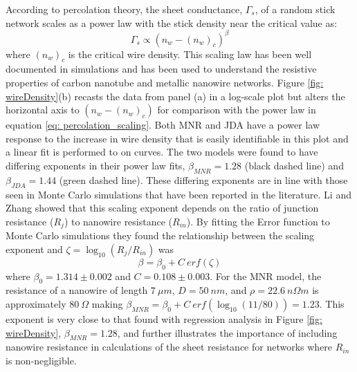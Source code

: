 According to percolation theory\cite{pike1974}, the sheet conductance, $\Gamma_s$, of a random stick network scales as a power law with the stick density near the critical value as:
\begin{equation}
\Gamma_s \propto (n_w - (n_w)_c)^{\beta}
\label{eq: percolation_scaling}
\end{equation}
where $(n_w)_c$ is the critical wire density. This scaling law has been well documented in simulations\cite{pike1974,li2009,zezelj2012} and has been used to understand the resistive properties of carbon nanotube\cite{hu2004,hecht2006} and metallic nanowire networks\cite{nirmalraj2009,bergin2012}. Figure \ref{fig: wireDensity}(b) recasts the data from panel (a) in a log-scale plot but alters the horizontal axis to $(n_w - (n_w)_c)$ for comparison with the power law in equation \ref{eq: percolation_scaling}. Both MNR and JDA have a power law response to the increase in wire density that is easily identifiable in this plot and a linear fit is performed to on curves. The two models were found to have differing exponents in their power law fits, $\beta_{MNR}=1.28$ (black dashed line) and $\beta_{JDA}= 1.44$ (green dashed line). These differing exponents are in line with those seen in Monte Carlo simulations that have been reported in the literature\cite{li2009}. Li and Zhang showed that this scaling exponent depends on the ratio of junction resistance ($R_j$) to nanowire resistance ($R_{in}$). By fitting the Error function to Monte Carlo simulations they found the relationship between the scaling exponent and $\zeta = \log_{10}(R_j/R_{in})$ was 
\begin{equation}
\beta = \beta_0 + C~ erf(\zeta)
\end{equation}
where $\beta_0 = 1.314 \pm 0.002$ and $C = 0.108 \pm 0.003$. For the MNR model, the resistance of a nanowire of length $7~ \mu m$, $D = 50 ~ nm$, and $\rho = 22.6 ~ n \Omega m$ is approximately $ 80~ \Omega$ making $\beta_{MNR} = \beta_0 + C~erf( \log_{10}(11/80)) = 1.23$. This exponent is very close to that found with regression analysis in Figure \ref{fig: wireDensity}, $\beta_{MNR} = 1.28$, and further illustrates the importance of including nanowire resistance in calculations of the sheet resistance for networks where $R_{in}$ is non-negligible.

